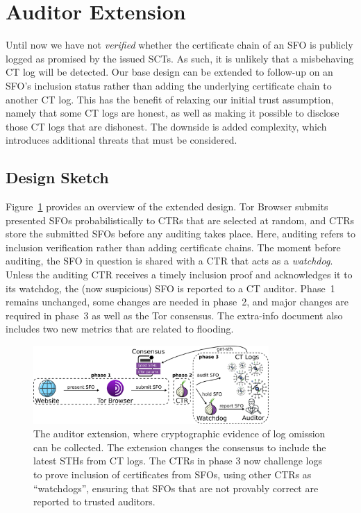 \section{Auditor Extension} \label{sec:auditor}
Until now we have not \emph{verified} whether the certificate chain of an SFO is
publicly logged as promised by the issued SCTs.  As such, it is unlikely that a
misbehaving CT log will be detected.
Our base design can be extended to follow-up
on an SFO's inclusion status rather than adding the underlying certificate chain
to another CT log.  This has the benefit of relaxing our initial trust
assumption, namely that some CT logs are honest, as well as making it possible
to disclose those CT logs that are dishonest.  The downside is added
complexity, which introduces additional threats that must be considered.

\subsection{Design Sketch} \label{sec:auditor:design}
Figure~\ref{fig:auditor} provides an overview of the extended design.  Tor
Browser submits presented SFOs probabilistically to CTRs that are selected at
random, and CTRs store the submitted SFOs before any auditing takes place.
Here, auditing refers to inclusion verification rather than adding certificate
chains.  The moment before auditing, the SFO in question is shared with a CTR
that acts as a \emph{watchdog}.  Unless the auditing CTR receives a timely
inclusion proof and acknowledges it to its watchdog, the (now suspicious) SFO is
reported to a CT auditor.  Phase~1 remains unchanged, some changes are needed
in phase~2, and major changes are required in phase~3 as well as the Tor
consensus.  The extra-info document also includes two new metrics that are
related to flooding.

\begin{figure}
    \centering
	\includegraphics[width=0.8\textwidth]{img/design-auditor}
	\vspace{-8px}
	\caption{The auditor extension, where cryptographic evidence of log omission
	can be collected. The extension changes the consensus to include the latest
	STHs from CT logs. The CTRs in phase 3 now challenge logs to prove inclusion
	of certificates from SFOs, using other CTRs as ``watchdogs'', ensuring that
	SFOs that are not provably correct are reported to trusted auditors.}
	\label{fig:auditor}
	\vspace{-10px}
\end{figure}

